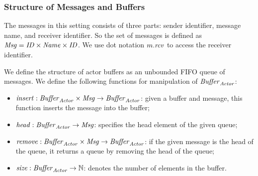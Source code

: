 \subsubsection{Structure of Messages and Buffers}
The messages in this setting consists of three parts: sender identifier, message name, and receiver identifier. So the set of messages is defined as $\mathit{Msg} = \mathit{ID}\times\mathit{Name}\times \mathit{ID}$. We use dot notation $m.\mathit{rcv}$ to access the receiver identifier.  

We define the structure of actor buffers as an unbounded FIFO queue of messages. %
We define the following functions for manipulation of $\mathit{Buffer}_{\it Actor}$:\begin{itemize} 
\item $\mathit{insert}:\mathit{Buffer}_{\it Actor} \times \mathit{Msg}\rightarrow \mathit{Buffer}_{\it Actor}$: given a buffer and message, this function inserts the message into the buffer;
\item $\mathit{head}:\mathit{Buffer}_{\it Actor} \rightarrow \mathit{Msg}$: specifies the head element of the given queue;
\item $\mathit{remove}:\mathit{Buffer}_{\it Actor} \times \mathit{Msg} \rightarrow \mathit{Buffer}_{\it Actor} $: if the given message is the head of the queue, it returns a queue by removing the head of the queue;
\item $\mathit{size}:\mathit{Buffer}_{\it Actor} \rightarrow \mathbb{N}$: denotes the number of elements in the buffer.
\end{itemize}



